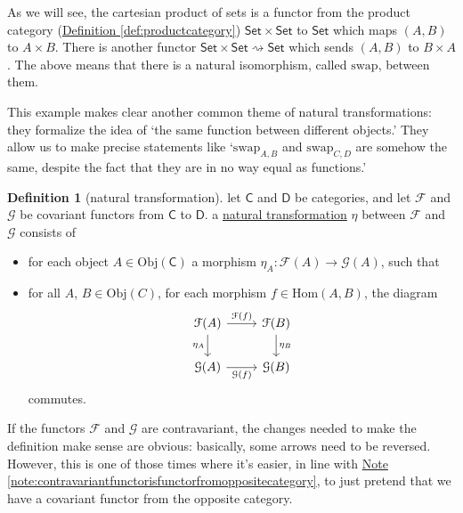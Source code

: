 \documentclass[a4paper,10pt]{scrreprt}
\newcommand{\defn}[1]{\ul{#1}}
\newcommand{\Obj}{\mathrm{Obj}}
\newcommand{\Hom}{\mathrm{Hom}}
\theoremstyle{definition}
\newtheorem{definition}{Definition}[section]
\theoremstyle{plain}
\theoremstyle{remark}
\begin{document}
As we will see, the cartesian product of sets is a functor from the product category (\hyperref[def:productcategory]{Definition \ref*{def:productcategory}}) $\mathsf{Set} \times \mathsf{Set}$ to $\mathsf{Set}$ which maps $(A, B)$ to $A \times B$. There is another functor $\mathsf{Set} \times \mathsf{Set} \rightsquigarrow \mathsf{Set}$ which sends $(A, B)$ to $B \times A$. The above means that there is a natural isomorphism, called $\mathrm{swap}$, between them.

This example makes clear another common theme of natural transformations: they formalize the idea of `the same function between different objects.' They allow us to make precise statements like `$\mathrm{swap}_{A, B}$ and $\mathrm{swap}_{C, D}$ are somehow the same, despite the fact that they are in no way equal as functions.'

\begin{definition}[natural transformation]
  \label{def:naturaltransformation}
  let $\mathsf{C}$ and $\mathsf{D}$ be categories, and let $\mathcal{F}$ and $\mathcal{G}$ be covariant functors from $\mathsf{C}$ to $\mathsf{D}$. a \defn{natural transformation} $\eta$ between $\mathcal{F}$ and $\mathcal{G}$ consists of 
  \begin{itemize}
    \item for each object $A \in \Obj(\mathsf{C})$ a morphism $\eta_{A}\colon \mathcal{F}(A) \to \mathcal{G}(A)$, such that
    \item for all $A$, $B \in \Obj(C)$, for each morphism $f \in \Hom(A,B)$, the diagram
      \begin{equation*}
        \begin{tikzcd}
          \mathcal{F}(A)\arrow[d, swap, "\eta_{A}"] \arrow[r, "\mathcal{F}(f)"] & \mathcal{F}(B)\arrow[d, "\eta_{B}"] \\
          \mathcal{G}(A) \arrow[r, swap, "\mathcal{G}(f)"] & \mathcal{G}(B) 
        \end{tikzcd}
      \end{equation*}
      commutes.
  \end{itemize}

  If the functors $\mathcal{F}$ and $\mathcal{G}$ are contravariant, the changes needed to make the definition make sense are obvious: basically, some arrows need to be reversed. However, this is one of those times where it's easier, in line with \hyperref[note:contravariantfunctorisfunctorfromoppositecategory]{Note \ref*{note:contravariantfunctorisfunctorfromoppositecategory}}, to just pretend that we have a covariant functor from the opposite category.

\end{definition}
\end{document}
